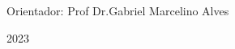 \begin{center}
   	
   	\ABNTEXchapterfont\Large\textsc{\imprimirautor}
   	\vspace{2.5cm}
   	
   	\ABNTEXchapterfont\LARGE\textsc{\imprimirtitulo\ifdef{\osubtitulo}{:}{}}

    \ifdef{\osubtitulo}{\ABNTEXchapterfont\Large\imprimirsubtitulo}{}
   	\vspace{2.5cm}
   	   	
   	\hspace{.4\textwidth}
   	\begin{minipage}{.5\textwidth}
   		\SingleSpacing
   		\large\imprimirpreambulo
   		
   		\vspace{\onelineskip}
   		
   		Orientador: Prof Dr.Gabriel Marcelino Alves
        
        
   		
   	\end{minipage}%
    \vfill
   	
   	\Large\textsc{\imprimirlocal}
   	
   	\Large\textsc{2023}
   	
   	\vspace*{2cm}
   	
\end{center}